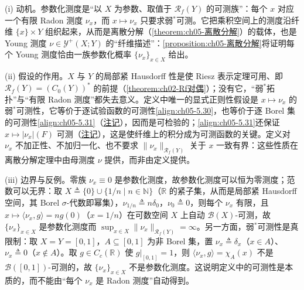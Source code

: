 \documentclass[../../main.tex]{subfiles}%
\begin{document}
\begin{remark}\label{remark:ch05-参数测度动机}
(i) 动机。参数化测度是“以 $X$ 为参数、取值于 $\mathscr{R}_f(Y)$ 的可测族”：每个 $x$ 对应一个有限 Radon 测度 $\nu_x$，而 $x\mapsto\nu_x$ 只要求弱$^*$可测。它把乘积空间上的测度沿纤维 $\{x\}\times Y$ 组织起来，从而是离散分解（\cref{theorem:ch05-离散分解}）的载体，也是 Young 测度 $\nu\in\mathcal{Y}^+(X;Y)$ 的“纤维描述”：\cref{proposition:ch05-离散分解}将证明每个 Young 测度恰由一族参数化概率 $\{\nu_x\}_{x\in X}$ 给出。

(ii) 假设的作用。$X$ 与 $Y$ 的局部紧 Hausdorff 性是使 Riesz 表示定理可用、即 $\mathscr{R}_f(Y)=(C_0(Y))^*$ 的前提（\cref{theorem:ch02-Rf对偶}）；没有它，“弱$^*$拓扑”与“有限 Radon 测度”都失去意义。定义中唯一的显式正则性假设是 $x\mapsto\nu_x$ 的弱$^*$可测性，它等价于逐试验函数的可测性\eqref{align:ch05-5.30}，也等价于逐 Borel 集的可测性\eqref{align:ch05-5.31}（\hyperref[remark:ch05-参数测度等价]{注记}），因而是可检验的；\eqref{align:ch05-5.31}还保证 $x\mapsto|\nu_x|(F)$ 可测（\hyperref[remark:ch05-变差可测]{注记}），这是使纤维上的积分成为可测函数的关键。定义对 $\nu_x$ 不加正性、不加归一化、也不要求 $\|\nu_x\|_{\mathscr{R}_f(Y)}$ 关于 $x$ 一致有界：这些性质在离散分解定理中由母测度 $\nu$ 提供，而非由定义提供。

(iii) 边界与反例。零族 $\nu_x\equiv0$ 是参数化测度，故参数化测度可以恒为零测度；范数可以无界：取 $X\triangleq\{0\}\cup\{1/n\mid n\in\mathbb{N}\}$（$\mathbb{R}$ 的紧子集，从而是局部紧 Hausdorff 空间，其 Borel $\sigma$-代数即幂集），$\nu_{1/n}\triangleq n\delta_0$，$\nu_0\triangleq0$，则每个 $\nu_x$ 有限，且 $x\mapsto\langle\nu_x,g\rangle=ng(0)$（$x=1/n$）在可数空间 $X$ 上自动 $\mathscr{B}(X)$-可测，故 $\{\nu_x\}_{x\in X}$ 是参数化测度而 $\sup_{x\in X}\|\nu_x\|_{\mathscr{R}_f(Y)}=\infty$。另一方面，弱$^*$可测性是真限制：取 $X=Y=[0,1]$，$A\subseteq[0,1]$ 为非 Borel 集，置 $\nu_x\triangleq\delta_x$（$x\in A$）、$\nu_x\triangleq0$（$x\notin A$）。取 $g\in C_c(\mathbb{R})$ 使 $g|_{[0,1]}=1$，则 $\langle\nu_x,g\rangle=\chi_A(x)$ 不是 $\mathscr{B}([0,1])$-可测的，故 $\{\nu_x\}_{x\in X}$ 不是参数化测度。这说明定义中的可测性是本质的，而不能由“每个 $\nu_x$ 是 Radon 测度”自动得到。
\end{remark}
\end{document}
